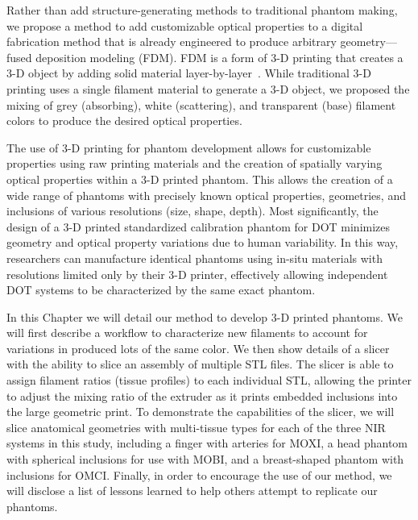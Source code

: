 Rather than add structure-generating methods to traditional phantom making, we propose a method to add customizable optical properties to a digital fabrication method that is already engineered to produce arbitrary geometry---fused deposition modeling (FDM). FDM is a form of 3-D printing that creates a 3-D object by adding solid material layer-by-layer~\cite{Dong2015}. While traditional 3-D printing uses a single filament material to generate a 3-D object, we proposed the mixing of grey (absorbing), white (scattering), and transparent (base) filament colors to produce the desired optical properties. 

The use of 3-D printing for phantom development allows for customizable properties using raw printing materials and the creation of spatially varying optical properties within a 3-D printed phantom. This allows the creation of a wide range of phantoms with precisely known optical properties, geometries, and inclusions of various resolutions (size, shape, depth). Most significantly, the design of a 3-D printed standardized calibration phantom for DOT minimizes geometry and optical property variations due to human variability. In this way, researchers can manufacture identical phantoms using in-situ materials with resolutions limited only by their 3-D printer, effectively allowing independent DOT systems to be characterized by the same exact phantom. 

In this Chapter we will detail our method to develop 3-D printed phantoms. We will first describe a workflow to characterize new filaments to account for variations in produced lots of the same color. We then show details of a slicer with the ability to slice an assembly of multiple STL files. The slicer is able to assign filament ratios (tissue profiles) to each individual STL, allowing the printer to adjust the mixing ratio of the extruder as it prints embedded inclusions into the large geometric print. To demonstrate the capabilities of the slicer, we will slice anatomical geometries with multi-tissue types for each of the three NIR systems in this study, including a finger with arteries for MOXI, a head phantom with spherical inclusions for use with MOBI, and a breast-shaped phantom with inclusions for OMCI. Finally, in order to encourage the use of our method, we will disclose a list of lessons learned to help others attempt to replicate our phantoms. 



